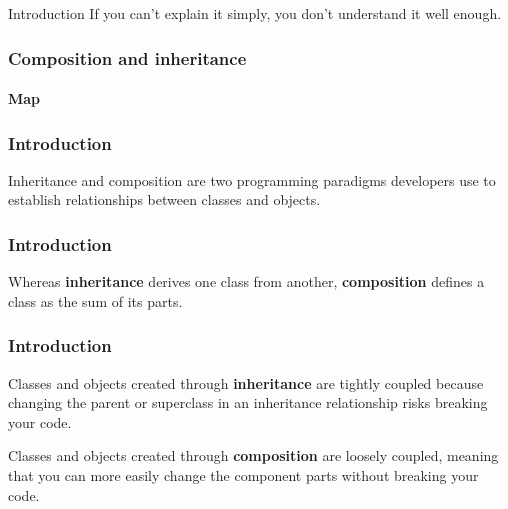 \begin{sepframe}{Introduction}
    {\scriptsize{If you can't explain it simply, you don't understand it well enough.}}
\end{sepframe}

\begin{frame}[fragile,c]
    \frametitle{Composition and inheritance}
    \framesubtitle{Map}

\end{frame}

\begin{frame}
    \frametitle{Introduction}

    Inheritance and composition are two programming paradigms developers use to establish
    relationships between classes and objects.
\end{frame}

\begin{frame}
    \frametitle{Introduction}

    Whereas \textbf{inheritance} derives one class from another, \textbf{composition} defines
    a class as the sum of its parts.
\end{frame}

\begin{frame}
    \frametitle{Introduction}

    Classes and objects created through \textbf{inheritance} are tightly coupled because
    changing the parent or superclass in an inheritance relationship risks breaking your code.

    \pause

    \vfill

    Classes and objects created through \textbf{composition} are loosely coupled, meaning
    that you can more easily change the component parts without breaking your code.
\end{frame}

